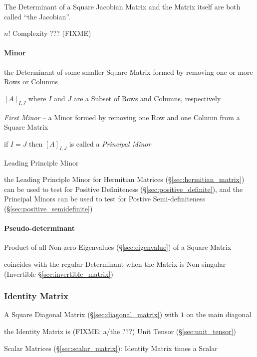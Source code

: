 The Determinant of a Square Jacobian Matrix and the Matrix itself are both
called ``the Jacobian''.

$n!$ Complexity ??? (FIXME)



\paragraph{Minor}\label{sec:minor}\hfill

the Determinant of some smaller Square Matrix formed by removing one or more
Rows or Columns

$[A]_{I,J}$ where $I$ and $J$ are a Subset of Rows and Columns, respectively

\emph{First Minor} -- a Minor formed by removing one Row and one Column from a
Square Matrix

if $I = J$ then $[A]_{I,J}$ is called a \emph{Principal Minor}

Leading Principle Minor

the Leading Principle Minor for Hermitian Matrices
(\S\ref{sec:hermitian_matrix}) can be used to test for Positive Definiteness
(\S\ref{sec:positive_definite}), and the Principal Minors can be used to test
for Postive Semi-definiteness (\S\ref{sec:positive_semidefinite})



\paragraph{Pseudo-determinant}\label{sec:pseudo_determinant}\hfill

Product of all Non-zero Eigenvalues (\S\ref{sec:eigenvalue}) of a Square Matrix

coincides with the regular Determinant when the Matrix is Non-singular
(Invertible \S\ref{sec:invertible_matrix})



\subsubsection{Identity Matrix}\label{sec:identity_matrix}

A Square Diagonal Matrix (\S\ref{sec:diagonal_matrix}) with $1$ on the main
diagonal

the Identity Matrix is (FIXME: a/the ???) Unit Tensor (\S\ref{sec:unit_tensor})

Scalar Matrices (\S\ref{sec:scalar_matrix}): Identity Matrix times a Scalar

